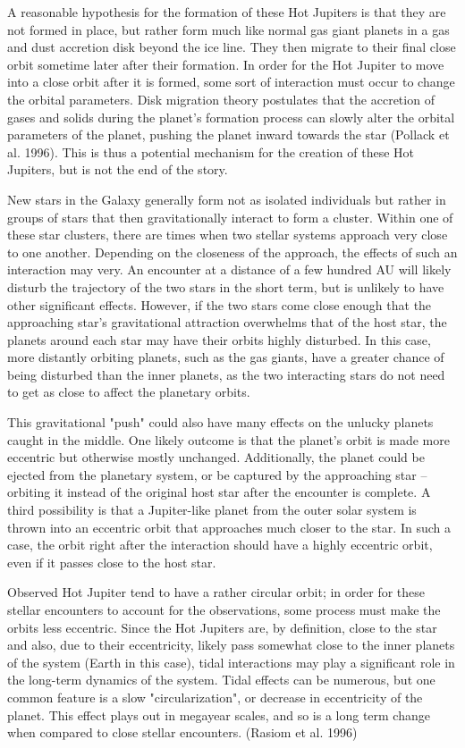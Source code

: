 \documentclass[12pt]{article}
\begin{document}
A reasonable hypothesis for the formation of these Hot Jupiters is that they are not formed in place, but rather form much like normal gas giant planets 
in a gas and dust accretion disk beyond the ice line. They then migrate to their final close orbit sometime later after their formation. 
In order for the Hot Jupiter to move into a close orbit after it is formed, some sort of interaction must occur to change the orbital parameters. 
Disk migration theory postulates that the accretion of gases and 
solids during the planet's formation process can slowly alter the orbital 
parameters of the planet,
pushing the planet inward towards the star (Pollack et al. 1996).
This is thus a potential mechanism for the creation of these Hot Jupiters, but is not the end of the story.

New stars in the Galaxy generally form not as isolated individuals but rather in groups of stars
that then gravitationally interact to form a cluster.
Within one of these star clusters, there are times when two stellar systems approach very close
to one another. Depending on the closeness of the approach, the effects of such
an interaction may very. An encounter at a distance of a few hundred AU will likely disturb the trajectory
of the two stars in the short term, but is unlikely to have other significant effects. However,
if the two stars come close enough that the approaching star's gravitational attraction
overwhelms that of the host star, the planets around each star may have their orbits
highly disturbed. In this case, more distantly orbiting planets, such as the gas giants,
have a greater chance of being disturbed than the inner planets, as the two 
interacting stars do not need to get as close to affect the planetary orbits.

This gravitational "push" could also have many effects on the unlucky planets caught in the
middle. One likely outcome is that the planet's orbit is made more eccentric but otherwise
mostly unchanged. Additionally, the planet could be ejected from the planetary system,
or be captured by the approaching star -- orbiting it instead of the original host star
after the encounter is complete. A third possibility is that a Jupiter-like planet
from the outer solar system is thrown into an eccentric 
orbit that approaches much closer to the
star. In such a case, the orbit right after the interaction should have a highly
eccentric orbit, even if it passes close to the host star. 

Observed Hot Jupiter tend to have a rather circular orbit; in order for these stellar 
encounters to account for the observations, some process must make the orbits 
less eccentric. Since the Hot Jupiters are, by definition, close to the star and
also, due to their eccentricity, likely pass somewhat close to the inner planets of the
system (Earth in this case), tidal interactions may play a significant role in the
long-term dynamics of the system. Tidal effects can be numerous, but one common feature
is a slow "circularization", or decrease in eccentricity of the planet. This effect
plays out in megayear scales, and so is a long term change when compared to close stellar
encounters. (Rasiom et al. 1996)
\end{document}
